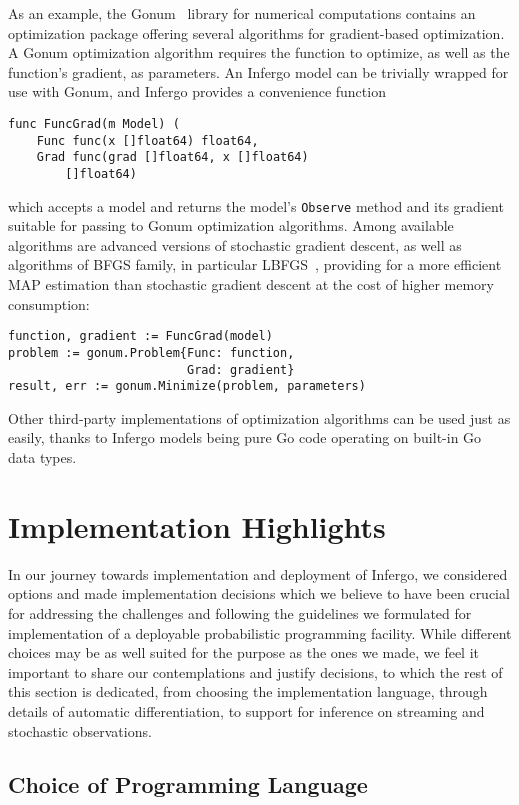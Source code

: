 \documentclass[sigplan,review,10pt,anonymous]{acmart}
\begin{document}
\begin{sloppypar}
As an example, the Gonum~\cite{Gonum} library for numerical
computations contains an optimization package offering several
algorithms for gradient-based optimization. A Gonum optimization
algorithm requires the function to optimize, as well as the
function's gradient, as parameters. An Infergo model can be
trivially wrapped for use with Gonum, and Infergo provides a
convenience function
\begin{lstlisting}
func FuncGrad(m Model) (
	Func func(x []float64) float64,
	Grad func(grad []float64, x []float64)
		[]float64)
\end{lstlisting}
which accepts a model and returns the model's
\lstinline{Observe} method and its gradient suitable for passing
to Gonum optimization algorithms. Among available algorithms are
advanced versions of stochastic gradient descent, as well as
algorithms of BFGS family, in particular LBFGS~\cite{LN89},
providing for a more efficient MAP estimation than stochastic
gradient descent at the cost of higher memory consumption:
\begin{lstlisting}
function, gradient := FuncGrad(model)
problem := gonum.Problem{Func: function, 
                         Grad: gradient}
result, err := gonum.Minimize(problem, parameters)
\end{lstlisting}

Other third-party implementations of optimization algorithms can
be used just as easily, thanks to Infergo models being pure Go
code operating on built-in Go data types.

\section{Implementation Highlights}

In our journey towards implementation and deployment of Infergo, we
considered options and made implementation decisions which we
believe to have been crucial for addressing the challenges and
following the guidelines we formulated for implementation of a
deployable probabilistic programming facility. While different
choices may be as well suited for the purpose as the ones we
made, we feel it important to share our contemplations and
justify decisions, to which the rest of this section is
dedicated, from choosing the implementation language, through
details of automatic differentiation, to support for inference
on streaming and stochastic observations.

\subsection{Choice of Programming Language}


\end{sloppypar}
\end{document}
